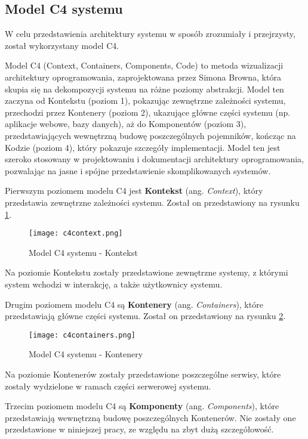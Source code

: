 \subsection{Model C4 systemu}

W celu przedstawienia architektury systemu w sposób zrozumiały i przejrzysty, został wykorzystany model C4.

Model C4 \cite{c4} (Context, Containers, Components, Code) to metoda wizualizacji architektury oprogramowania, zaprojektowana przez Simona Browna, która skupia się na dekompozycji systemu na różne poziomy abstrakcji. Model ten zaczyna od Kontekstu (poziom 1), pokazując zewnętrzne zależności systemu, przechodzi przez Kontenery (poziom 2), ukazujące główne części systemu (np. aplikacje webowe, bazy danych), aż do Komponentów (poziom 3), przedstawiających wewnętrzną budowę poszczególnych pojemników, kończąc na Kodzie (poziom 4), który pokazuje szczegóły implementacji. Model ten jest szeroko stosowany w projektowaniu i dokumentacji architektury oprogramowania, pozwalając na jasne i spójne przedstawienie skomplikowanych systemów.

Pierwszym poziomem modelu C4 jest \textbf{Kontekst} (ang. \textit{Context}), który przedstawia zewnętrzne zależności systemu. Został on przedstawiony na rysunku \ref{fig:c4context}.

\begin{figure}[!h]
    \centering \texttt{[image: c4context.png]}
    \caption{Model C4 systemu - Kontekst}
    \label{fig:c4context}
\end{figure}

Na poziomie Kontekstu zostały przedstawione zewnętrzne systemy, z którymi system wchodzi w interakcję, a także użytkownicy systemu.

Drugim poziomem modelu C4 są \textbf{Kontenery} (ang. \textit{Containers}), które przedstawiają główne części systemu. Został on przedstawiony na rysunku \ref{fig:c4containers}.

\begin{figure}[!h]
    \centering \texttt{[image: c4containers.png]}
    \caption{Model C4 systemu - Kontenery}
    \label{fig:c4containers}
\end{figure}

Na poziomie Kontenerów zostały przedstawione poszczególne serwisy, które zostały wydzielone w ramach części serwerowej systemu.

Trzecim poziomem modelu C4 są \textbf{Komponenty} (ang. \textit{Components}), które przedstawiają wewnętrzną budowę poszczególnych Kontenerów. Nie zostały one przedstawione w niniejszej pracy, ze względu na zbyt dużą szczegółowość. 

